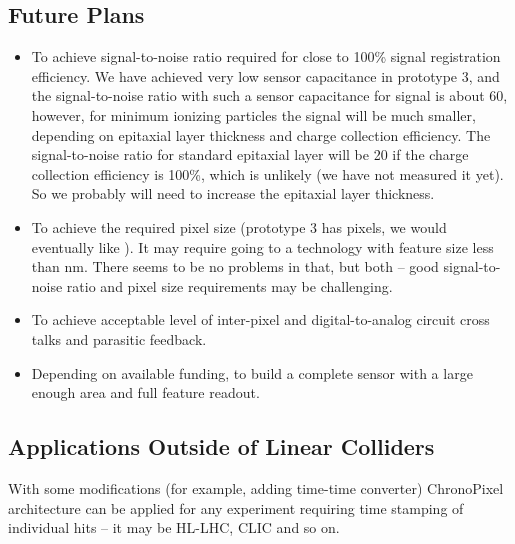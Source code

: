 \subsection{Future Plans}
\begin{itemize}
    \item To achieve signal-to-noise ratio required for close to 100\% signal registration efficiency. We have achieved very low sensor capacitance in prototype 3, and the signal-to-noise ratio with such a sensor capacitance for  signal is about 60, however, for minimum ionizing particles the signal will be much smaller, depending on epitaxial layer thickness and charge collection efficiency. The signal-to-noise ratio for standard \unit[7]{\micron} epitaxial layer will be 20 if the charge collection efficiency is 100\%, which is unlikely (we have not measured it yet). So we probably will need to increase the epitaxial layer thickness.
    \item To achieve the required pixel size (prototype 3 has \unit[25]{\micron} pixels, we would eventually like \unit[15]{\micron}). It may require going to a technology with feature size less than \unit[65]{nm}. There seems to be no problems in that, but both -- good signal-to-noise ratio and pixel size requirements may be challenging.
    \item To achieve acceptable level of inter-pixel and digital-to-analog circuit cross talks and parasitic feedback.
    \item Depending on available funding, to build a complete sensor with a large enough area and full feature readout.
\end{itemize}

\subsection{Applications Outside of Linear Colliders}
     With some modifications (for example, adding time-time converter) ChronoPixel architecture can be applied for any experiment requiring time stamping of individual hits -- it may be HL-LHC, CLIC and so on.
